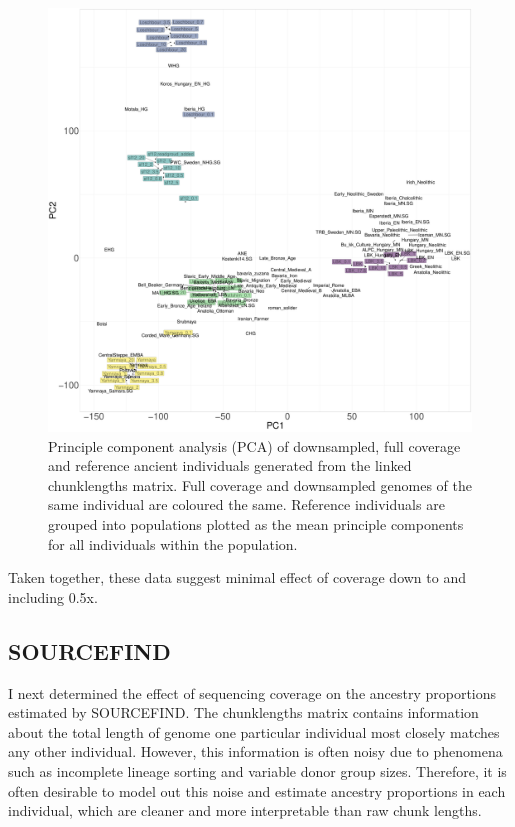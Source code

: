 \begin{figure}[htp]
    \centering
    \includegraphics[width=1.0\textwidth]{../images/chapter1/PCA_panel_allInds.allCoverage.pdf}
    \caption{Principle component analysis (PCA) of downsampled, full coverage and reference ancient individuals generated from the linked chunklengths matrix. Full coverage and downsampled genomes of the same individual are coloured the same. Reference individuals are grouped into populations plotted as the mean principle components for all individuals within the population.}
    \label{fig:PCA_panel_allInds_allCoverage}
\end{figure}

Taken together, these data suggest minimal effect of coverage down to and including 0.5x.

\subsection{SOURCEFIND}

I next determined the effect of sequencing coverage on the ancestry proportions estimated by SOURCEFIND. The chunklengths matrix contains information about the total length of genome one particular individual most closely matches any other individual. However, this information is often noisy due to phenomena such as incomplete lineage sorting and variable donor group sizes. Therefore, it is often desirable to model out this noise and estimate ancestry proportions in each individual, which are cleaner and more interpretable than raw chunk lengths. 

